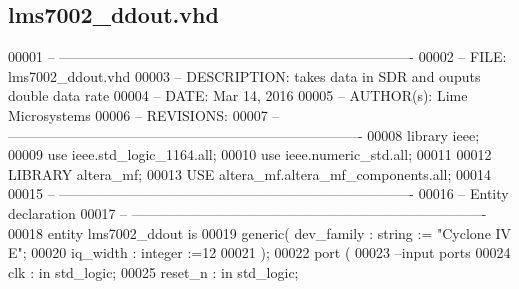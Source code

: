 \subsection{lms7002\+\_\+ddout.\+vhd}
\label{altera__inst_2lms7002__ddout_8vhd_source}

\begin{DoxyCode}
00001 \textcolor{keyword}{-- ---------------------------------------------------------------------------- }
00002 \textcolor{keyword}{-- FILE:    lms7002\_ddout.vhd}
00003 \textcolor{keyword}{-- DESCRIPTION: takes data in SDR and ouputs double data rate}
00004 \textcolor{keyword}{-- DATE:    Mar 14, 2016}
00005 \textcolor{keyword}{-- AUTHOR(s):   Lime Microsystems}
00006 \textcolor{keyword}{-- REVISIONS:}
00007 \textcolor{keyword}{-- ---------------------------------------------------------------------------- }
00008 \textcolor{vhdlkeyword}{library }\textcolor{keywordflow}{ieee};
00009 \textcolor{vhdlkeyword}{use }ieee.std\_logic\_1164.\textcolor{keywordflow}{all};
00010 \textcolor{vhdlkeyword}{use }ieee.numeric\_std.\textcolor{keywordflow}{all};
00011 
00012 \textcolor{vhdlkeyword}{LIBRARY }\textcolor{keywordflow}{altera\_mf};
00013 \textcolor{vhdlkeyword}{USE }altera_mf.altera\_mf\_components.\textcolor{keywordflow}{all};
00014 
00015 \textcolor{keyword}{-- ----------------------------------------------------------------------------}
00016 \textcolor{keyword}{-- Entity declaration}
00017 \textcolor{keyword}{-- ----------------------------------------------------------------------------}
00018 \textcolor{keywordflow}{entity }lms7002_ddout \textcolor{keywordflow}{is}
00019     \textcolor{keywordflow}{generic}\textcolor{vhdlchar}{(} \textcolor{vhdlchar}{dev_family} \textcolor{vhdlchar}{:} \textcolor{comment}{string} \textcolor{vhdlchar}{:=} \textcolor{keyword}{"Cyclone IV E"};
00020                 \textcolor{vhdlchar}{iq_width}        \textcolor{vhdlchar}{:} \textcolor{comment}{integer} \textcolor{vhdlchar}{:=}\textcolor{vhdllogic}{}\textcolor{vhdllogic}{12}
00021     \textcolor{vhdlchar}{)};
00022     \textcolor{keywordflow}{port} \textcolor{vhdlchar}{(}
00023 \textcolor{keyword}{      --input ports }
00024       \textcolor{vhdlchar}{clk}           \textcolor{vhdlchar}{:} \textcolor{keywordflow}{in} \textcolor{comment}{std\_logic};
00025       \textcolor{vhdlchar}{reset_n}       \textcolor{vhdlchar}{:} \textcolor{keywordflow}{in} \textcolor{comment}{std\_logic};

\end{DoxyCode}
